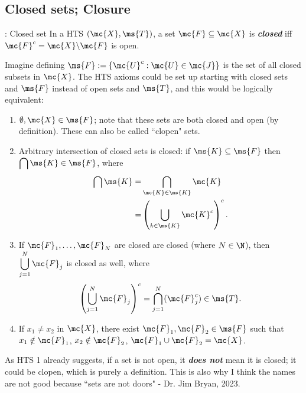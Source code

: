 \subsection{Closed sets; Closure}
\begin{ndef}{: Closed set}
	In a HTS \((\mc{X},\ms{T})\), a set \(\mc{F}\subseteq\mc{X}\) is \emph{\textbf{closed}} iff \(\mc{F}^c=\mc{X}\backslash\mc{F}\) is open.
\end{ndef}
Imagine defining \(\ms{F}:=\{\mc{U}^c:\mc{U}\in\mc{J}\}\) is the set of all closed subsets in \(\mc{X}\). The HTS axioms could be set up starting with closed sets and \(\ms{F}\) instead of open sets and \(\ms{T}\), and this would be logically equivalent:
\begin{enumerate}[(HTS~1)]
	\item \(\emptyset,\mc{X}\in\ms{F}\); note that these sets are both closed and open (by definition). These can also be called ``clopen" sets.
	
	\item Arbitrary intersection of closed sets is closed: if \(\ms{K}\subseteq\ms{F}\) then \(\displaystyle\bigcap\ms{K}\in\ms{F}\), where 
	\begin{align*}
		\bigcap\ms{K}=&\bigcap_{\mc{K}\in\ms{K}}\mc{K}\\
		=&\left(\bigcup_{k\in\ms{K}}\mc{K}^c\right)^c.
	\end{align*}
	
	\item If \(\mc{F}_1,\dots,\mc{F}_N\) are closed are closed (where \(N\in\N\)), then \(\displaystyle\bigcup_{j=1}^N \mc{F}_j\) is closed as well, where 
	\begin{equation*}
		\left(\bigcup_{j=1}^N \mc{F}_j\right)^c=\bigcap_{j=1}^N(\mc{F}_j^c)\in\ms{T}.
	\end{equation*}
	
	\item If \(x_1\neq x_2\) in  \(\mc{X}\), there exist \(\mc{F}_1,\mc{F}_2\in\ms{F}\) such that \(x_1\notin\mc{F}_1\), \(x_2\notin\mc{F}_2\), \(\mc{F}_1\cup\mc{F}_2=\mc{X}\).
\end{enumerate}
\begin{note}
	As HTS 1 already suggests, if a set is not open, it \emph{\textbf{does not}} mean it is closed; it could be clopen, which is purely a definition. This is also why I think the names are not good because ``sets are not doors" - Dr. Jim Bryan, 2023.
\end{note}
